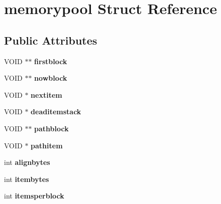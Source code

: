 \hypertarget{structmemorypool}{
\section{memorypool Struct Reference}
\label{structmemorypool}
}
\subsection*{Public Attributes}
\begin{DoxyCompactItemize}
\item 
\hypertarget{structmemorypool_afac6d33dcfe9df284f27ca630123332f}{
VOID $\ast$$\ast$ {\bfseries firstblock}}
\label{structmemorypool_afac6d33dcfe9df284f27ca630123332f}

\item 
\hypertarget{structmemorypool_aaf9ecf13c92d2bfbf3bcbfb8715e19f0}{
VOID $\ast$$\ast$ {\bfseries nowblock}}
\label{structmemorypool_aaf9ecf13c92d2bfbf3bcbfb8715e19f0}

\item 
\hypertarget{structmemorypool_a998808704144a4045a7e03656ef94185}{
VOID $\ast$ {\bfseries nextitem}}
\label{structmemorypool_a998808704144a4045a7e03656ef94185}

\item 
\hypertarget{structmemorypool_a994ac2f58b146dc4eaef504a70358582}{
VOID $\ast$ {\bfseries deaditemstack}}
\label{structmemorypool_a994ac2f58b146dc4eaef504a70358582}

\item 
\hypertarget{structmemorypool_a72733c1e19035f973e60706be7b32364}{
VOID $\ast$$\ast$ {\bfseries pathblock}}
\label{structmemorypool_a72733c1e19035f973e60706be7b32364}

\item 
\hypertarget{structmemorypool_a60cac87ccd6a441c5358a5bf9fcf3064}{
VOID $\ast$ {\bfseries pathitem}}
\label{structmemorypool_a60cac87ccd6a441c5358a5bf9fcf3064}

\item 
\hypertarget{structmemorypool_a143c77d997e424a4be406ee4b3338c12}{
int {\bfseries alignbytes}}
\label{structmemorypool_a143c77d997e424a4be406ee4b3338c12}

\item 
\hypertarget{structmemorypool_a2658208bb7b2949b51f679e0a8278e3b}{
int {\bfseries itembytes}}
\label{structmemorypool_a2658208bb7b2949b51f679e0a8278e3b}

\item 
\hypertarget{structmemorypool_a725760a5cc69917ea955ce4b64ed022f}{
int {\bfseries itemsperblock}}
\label{structmemorypool_a725760a5cc69917ea955ce4b64ed022f}


\end{DoxyCompactItemize}
